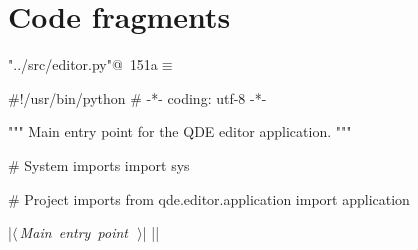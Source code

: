 \documentclass[%
    a4paper,    %
    justified,  %
    nobib,      %
    openany     %
]{tufte-book}
\begin{document}

\section{Code fragments}
\label{sec:code-fragments}

\begin{flushleft} \small
\begin{minipage}{\linewidth}\label{scrap166}\raggedright\small
{} \verb@"../src/editor.py"@\nobreak\ {\footnotesize {151a}}$\equiv$
\vspace{-1ex}
\begin{pythoncode}
#!/usr/bin/python
# -*- coding: utf-8 -*-

""" Main entry point for the QDE editor application. """

# System imports
import sys

# Project imports
from qde.editor.application import application

|\hbox{$\langle\,${\itshape Main entry point}\nobreak\ {\footnotesize {}}$\,\rangle$}|
|\NWsep|
\end{pythoncode}
\vspace{1.5ex}
\footnotesize
\begin{list}{}{\setlength{\itemsep}{-\parsep}\setlength{\itemindent}{-\leftmargin}}

\item{}
\end{list}
\end{minipage}\vspace{4ex}
\end{flushleft}
\end{document}
